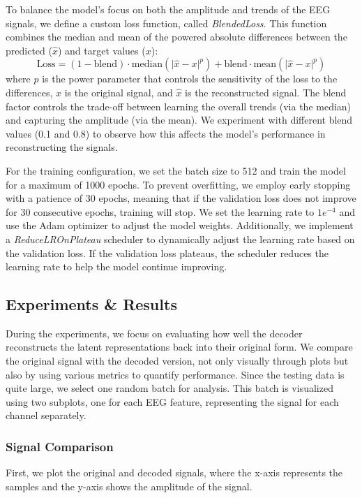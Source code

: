 To balance the model's focus on both the amplitude and trends of the EEG signals, we define a custom loss function, called \emph{BlendedLoss}. This function combines the median and mean of the powered absolute differences between the predicted ($\hat{x}$) and target values ($x$):
%
\begin{equation}
\text{Loss} = (1 - \text{blend}) \cdot \text{median}(\lvert \hat{x} - x \rvert^p) + \text{blend} \cdot \text{mean}(\lvert \hat{x} - x \rvert^p)
\end{equation}
%
where $p$ is the power parameter that controls the sensitivity of the loss to the differences, $x$ is the original signal, and $\hat{x}$ is the reconstructed signal. The blend factor controls the trade-off between learning the overall trends (via the median) and capturing the amplitude (via the mean). We experiment with different blend values (0.1 and 0.8) to observe how this affects the model’s performance in reconstructing the signals.

For the training configuration, we set the batch size to 512 and train the model for a maximum of 1000 epochs. To prevent overfitting, we employ early stopping with a patience of 30 epochs, meaning that if the validation loss does not improve for 30 consecutive epochs, training will stop. We set the learning rate to $1e^{-4}$ and use the Adam optimizer to adjust the model weights. Additionally, we implement a \emph{ReduceLROnPlateau} scheduler to dynamically adjust the learning rate based on the validation loss. If the validation loss plateaus, the scheduler reduces the learning rate to help the model continue improving.

\subsection{Experiments \& Results}

During the experiments, we focus on evaluating how well the decoder reconstructs the latent representations back into their original form. We compare the original signal with the decoded version, not only visually through plots but also by using various metrics to quantify performance. Since the testing data is quite large, we select one random batch for analysis. This batch is visualized using two subplots, one for each EEG feature, representing the signal for each channel separately.

\subsubsection{Signal Comparison} First, we plot the original and decoded signals, where the x-axis represents the samples and the y-axis shows the amplitude of the signal.

